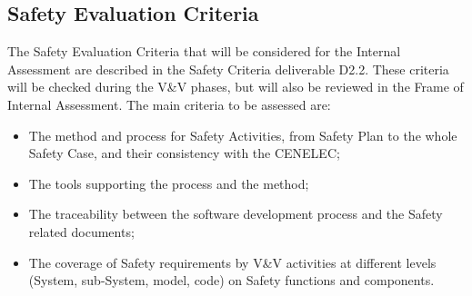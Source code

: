 \documentclass{template/openetcs_article}
\begin{document}
\subsection{Safety Evaluation Criteria}
The Safety Evaluation Criteria that will be considered for the Internal Assessment are described in the Safety Criteria deliverable D2.2. These criteria will be
checked during the V\&V phases, but will also be reviewed in the Frame of Internal Assessment.
The main criteria to be assessed are:
\begin{itemize}
\item The method and process for Safety Activities, from Safety Plan to the whole Safety Case, and their consistency with the CENELEC;
\item The tools supporting the process and the method;
\item The traceability between the software development process and the Safety related documents;
\item The coverage of Safety requirements by V\&V activities at different levels (System,  sub-System, model, code) on Safety functions and components.
\end{itemize}
\end{document}
